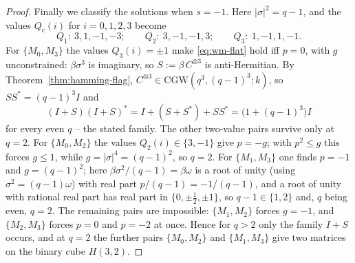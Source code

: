 \documentclass[10pt,a4paper]{amsart}
\newcommand{\CGW}{\mathrm{CGW}}
\begin{document}
\begin{proof}
Finally we classify the solutions when $s=-1$.  Here $|\sigma|^2=q-1$, and the values
$Q_c(i)$ for $i=0,1,2,3$ become
\[
  Q_1:\ 3,1,-1,-3; \qquad Q_2:\ 3,-1,-1,3; \qquad Q_3:\ 1,-1,1,-1.
\]
For $\{M_0,M_3\}$ the values $Q_3(i)=\pm1$ make \eqref{eq:wm-flat} hold iff $p=0$,
with $g$ unconstrained: $\beta\sigma^3$ is imaginary, so $S:=\beta\,C^{\otimes3}$
is anti-Hermitian.  By Theorem~\ref{thm:hamming-flag},
$C^{\otimes3}\in\CGW(q^3,(q-1)^3;k)$, so $SS^*=(q-1)^3I$ and
\[
  (I+S)(I+S)^*=I+(S+S^*)+SS^*=\bigl(1+(q-1)^3\bigr)I
\]
for every even $q$ -- the stated family.  The other two-value pairs survive only
at $q=2$.  For $\{M_0,M_2\}$ the values $Q_2(i)\in\{3,-1\}$ give $p=-g$; with
$p^2\le g$ this forces $g\le1$, while $g=|\sigma|^4=(q-1)^2$, so $q=2$.  For
$\{M_1,M_3\}$ one finds $p=-1$ and $g=(q-1)^2$; here
$\beta\sigma^2/(q-1)=\beta\omega$ is a root of unity (using $\sigma^2=(q-1)\omega$)
with real part $p/(q-1)=-1/(q-1)$, and a root of unity with rational real part has
real part in $\{0,\pm\tfrac12,\pm1\}$, so $q-1\in\{1,2\}$ and, $q$ being even,
$q=2$.  The
remaining pairs are impossible: $\{M_1,M_2\}$ forces $g=-1$, and $\{M_2,M_3\}$
forces $p=0$ and $p=-2$ at once.  Hence for $q>2$ only the family $I+S$ occurs,
and at $q=2$ the further pairs $\{M_0,M_2\}$ and $\{M_1,M_3\}$ give two matrices
on the binary cube $H(3,2)$.
\end{proof}
\end{document}
